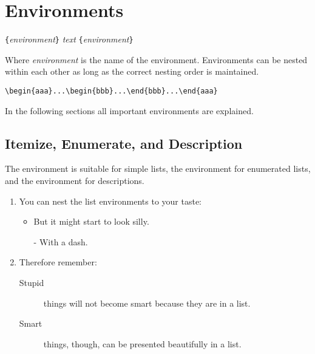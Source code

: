 \section{Environments} \label{env}

\begin{lscommand}
\verb|{|\emph{environment}\verb|}|\quad
   \emph{text}\quad
{}\verb|{|\emph{environment}\verb|}|
\end{lscommand}
\noindent Where \emph{environment} is the name of the environment. Environments can be
nested within each other as long as the correct nesting order is
maintained.
\begin{code}
\verb|\begin{aaa}...\begin{bbb}...\end{bbb}...\end{aaa}|
\end{code}

\noindent In the following sections all important environments are explained.

\subsection{Itemize, Enumerate, and Description}

The  environment is suitable for simple lists, the
 environment for enumerated lists, and the
 environment for descriptions.

\begin{example}
\flushleft
\begin{enumerate}
\item You can nest the list
environments to your taste:
\begin{itemize}
\item But it might start to
look silly. 
\item[-] With a dash.
\end{itemize}
\item Therefore remember:
\begin{description}
\item[Stupid] things will not
become smart because they are
in a list.
\item[Smart] things, though,
can be presented beautifully
in a list.
\end{description}
\end{enumerate}
\end{example}
 
